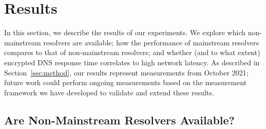 \section{Results}\label{sec:results} 

In this section, we describe the results of our experiments.  We explore which
non-mainstream resolvers are available; how
the performance of mainstream resolvers compares to that of non-mainstream
resolvers; and whether (and to what extent) encrypted DNS response time
correlates to high network latency. As described
in Section~\ref{sec:method}, our results represent measurements
from October 2021; future work could perform ongoing
measurements based on the measurement framework we have developed to validate
and extend these results.

\subsection{Are Non-Mainstream Resolvers Available?}

